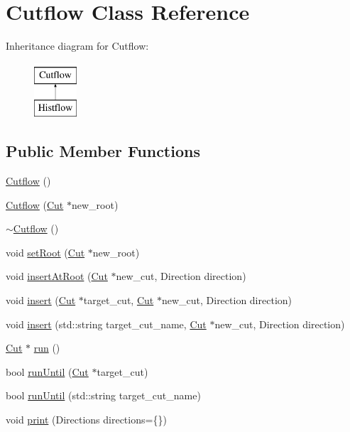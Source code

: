 \hypertarget{classCutflow}{}\section{Cutflow Class Reference}
\label{classCutflow}
Inheritance diagram for Cutflow\+:\begin{figure}[H]
\begin{center}
\leavevmode
\includegraphics[height=2.000000cm]{classCutflow}
\end{center}
\end{figure}
\subsection*{Public Member Functions}
\begin{DoxyCompactItemize}
\item 
\hyperlink{classCutflow_a17811cb40a7906fc65e79ce69e3b21be}{Cutflow} ()
\item 
\hyperlink{classCutflow_a943ac94db62104f63499c41b5aa83b4d}{Cutflow} (\hyperlink{classCut}{Cut} $\ast$new\+\_\+root)
\item 
\hyperlink{classCutflow_adb300cd78d57a287934e4d22856a0ffe}{$\sim$\+Cutflow} ()
\item 
void \hyperlink{classCutflow_ad27d37141c3748779a5d81fad919ecbb}{set\+Root} (\hyperlink{classCut}{Cut} $\ast$new\+\_\+root)
\item 
void \hyperlink{classCutflow_a9cee412ae1a841068b0192120074b505}{insert\+At\+Root} (\hyperlink{classCut}{Cut} $\ast$new\+\_\+cut, Direction direction)
\item 
void \hyperlink{classCutflow_a35cf443b602a92cab92012da3ab5a93b}{insert} (\hyperlink{classCut}{Cut} $\ast$target\+\_\+cut, \hyperlink{classCut}{Cut} $\ast$new\+\_\+cut, Direction direction)
\item 
void \hyperlink{classCutflow_a8da46f1053a6b97991489ee0920c29a1}{insert} (std\+::string target\+\_\+cut\+\_\+name, \hyperlink{classCut}{Cut} $\ast$new\+\_\+cut, Direction direction)
\item 
\hyperlink{classCut}{Cut} $\ast$ \hyperlink{classCutflow_a563da4fc41aa5c611dd0ce37ce966f2c}{run} ()
\item 
bool \hyperlink{classCutflow_aaa3cecdf78988aacf6f7e89758addbbf}{run\+Until} (\hyperlink{classCut}{Cut} $\ast$target\+\_\+cut)
\item 
bool \hyperlink{classCutflow_a3b5a6dc6e9490037d190eca691295859}{run\+Until} (std\+::string target\+\_\+cut\+\_\+name)
\item 
void \hyperlink{classCutflow_a5d9f9fa315303fa9f63738dd41c05042}{print} (Directions directions=\{\})
\end{DoxyCompactItemize}
